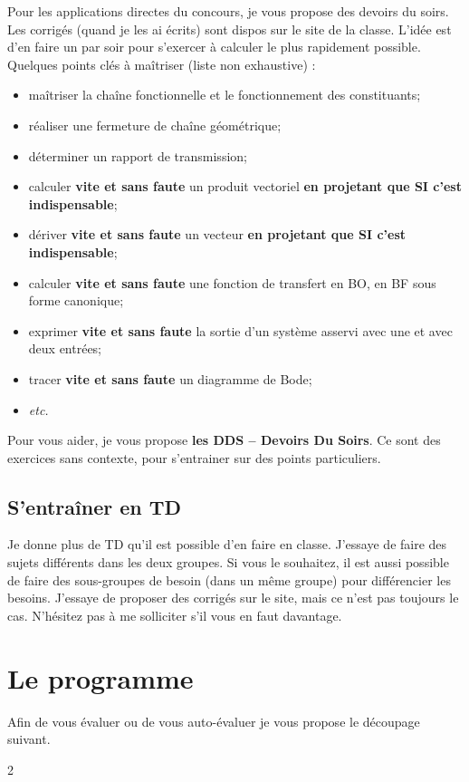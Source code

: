 Pour les applications directes du concours, je vous propose des devoirs du soirs. Les corrigés (quand je les ai écrits) sont dispos sur le site de la classe. L'idée est d'en faire un par soir pour s'exercer à calculer le plus rapidement possible. Quelques points clés à maîtriser (liste non exhaustive) : 
\begin{itemize}
\item maîtriser la chaîne fonctionnelle et le fonctionnement des constituants;
\item réaliser une fermeture de chaîne géométrique;
\item déterminer un rapport de transmission;
\item calculer \textbf{vite et sans faute} un produit vectoriel \textbf{en projetant que SI c'est indispensable};
\item dériver \textbf{vite et sans faute} un vecteur \textbf{en projetant que SI c'est indispensable};
\item calculer \textbf{vite et sans faute} une fonction de transfert en BO, en BF sous forme canonique;
\item exprimer \textbf{vite et sans faute} la sortie d'un système asservi avec une et avec deux entrées;
\item tracer \textbf{vite et sans faute} un diagramme de Bode;
\item \textit{etc.}
\end{itemize}

Pour vous aider, je vous propose \textbf{les DDS -- Devoirs Du Soirs}. Ce sont des exercices sans contexte, pour s'entrainer sur des points particuliers.

\subsection{S'entraîner en TD}
Je donne plus de TD qu'il est possible d'en faire en classe. J'essaye de faire des sujets différents dans les deux groupes. Si vous le souhaitez, il est aussi possible de faire des sous-groupes de besoin (dans un même groupe) pour différencier les besoins.
J'essaye de proposer des corrigés sur le site, mais ce n'est pas toujours le cas. N'hésitez pas à me solliciter s'il vous en faut davantage. 



\section{Le programme}
 

Afin de vous évaluer ou de vous auto-évaluer je vous propose le découpage suivant.

\footnotesize
\begin{multicols}{2}
\allCompWide
\end{multicols}